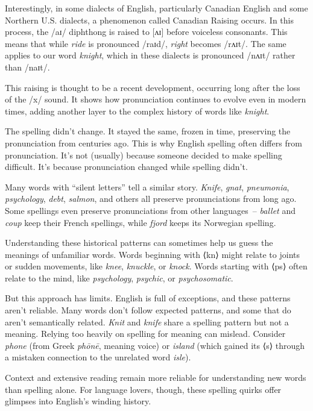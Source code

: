 Interestingly, in some dialects of English, particularly Canadian English and some Northern U.S. dialects, a phenomenon called Canadian Raising occurs. In this process, the /aɪ/ diphthong is raised to [ʌɪ] before voiceless consonants. This means that while \textit{ride} is pronounced /raɪd/, \textit{right} becomes /rʌɪt/. The same applies to our word \textit{knight}, which in these dialects is pronounced /nʌɪt/ rather than /naɪt/.

This raising is thought to be a recent development, occurring long after the loss of the /x/ sound. It shows how pronunciation continues to evolve even in modern times, adding another layer to the complex history of words like \textit{knight}.

The spelling didn't change. It stayed the same, frozen in time, preserving the pronunciation from centuries ago. This is why English spelling often differs from pronunciation. It's not (usually) because someone decided to make spelling difficult. It's because pronunciation changed while spelling didn't.

Many words with ``silent letters'' tell a similar story. \textit{Knife}, \textit{gnat}, \textit{pneumonia}, \textit{psychology}, \textit{debt}, \textit{salmon}, and others all preserve pronunciations from long ago. Some spellings even preserve pronunciations from other languages~-- \textit{ballet} and \textit{coup} keep their French spellings, while \textit{fjord} keeps its Norwegian spelling.

Understanding these historical patterns can sometimes help us guess the meanings of unfamiliar words. Words beginning with ⟨kn⟩ might relate to joints or sudden movements, like \textit{knee}, \textit{knuckle}, or \textit{knock}. Words starting with ⟨ps⟩ often relate to the mind, like \textit{psychology}, \textit{psychic}, or \textit{psychosomatic}.

But this approach has limits. English is full of exceptions, and these patterns aren't reliable. Many words don't follow expected patterns, and some that do aren't semantically related. \textit{Knit} and \textit{knife} share a spelling pattern but not a meaning. Relying too heavily on spelling for meaning can mislead. Consider \textit{phone} (from Greek \textit{phōnē}, meaning voice) or \textit{island} (which gained its ⟨s⟩ through a mistaken connection to the unrelated word \textit{isle}).

Context and extensive reading remain more reliable for understanding new words than spelling alone. For language lovers, though, these spelling quirks offer glimpses into English's winding history.

